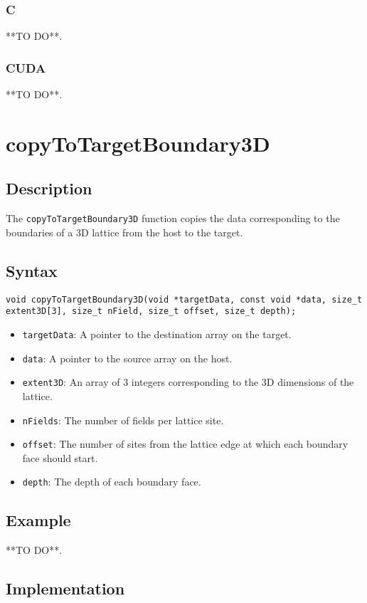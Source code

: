 \subsubsection{C}
**TO DO**.
\subsubsection{CUDA}
**TO DO**.


\newpage
\section{copyToTargetBoundary3D}

\subsection{Description}

The \verb+copyToTargetBoundary3D+ function copies the data corresponding to the boundaries of a 3D lattice from the host to the target.

\subsection{Syntax}
\begin{verbatim}
void copyToTargetBoundary3D(void *targetData, const void *data, size_t extent3D[3], size_t nField, size_t offset, size_t depth);
\end{verbatim}

\begin{itemize}
\item \verb+targetData+: A pointer to the destination array on the target.
\item \verb+data+: A pointer to the source array on the host.
\item \verb+extent3D+: An array of 3 integers corresponding to the 3D dimensions of the lattice.
\item \verb+nFields+: The number of fields per lattice site.
\item \verb+offset+: The number of sites from the lattice edge at which each boundary face should start.
\item \verb+depth+: The depth of each boundary face.
\end{itemize}


\subsection{Example}
**TO DO**.
\subsection{Implementation}
